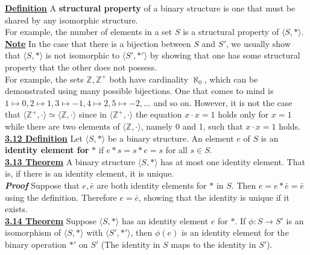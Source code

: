 \documentclass[12pt, letterpaper]{article}
\begin{document}
\noindent\underline{{\bf Definition}} A {\bf structural property} of a binary structure is one that must be shared by any isomorphic structure. \\

For example, the number of elements in a set $S$ is a structural property of $\langle S, *\rangle$. \\

\noindent \underline{{\bf Note}} In the case that there is a bijection between $S$ and $S'$, we usually show that $\langle S, *\rangle$ is not isomorphic to $\langle S', *'\rangle$ by showing that one has some structural property that the other does not possess. \\

For example, the sets $\mathbb{Z},\mathbb{Z}^+$ both have cardinality $\aleph_0$, which can be demonstrated using many possible bijections. One that comes to mind is $1 \mapsto 0, 2 \mapsto 1, 3 \mapsto -1, 4 \mapsto 2, 5 \mapsto -2, ...$ and so on. However, it is not the case that $\langle \mathbb{Z}^+, \cdot \rangle \simeq \langle \mathbb{Z}, \cdot \rangle$ since in $\langle \mathbb{Z}^+, \cdot \rangle$ the equation $x \cdot x = 1$ holds only for $x = 1$ while there are two elements of $\langle \mathbb{Z}, \cdot \rangle$, namely 0 and 1, such that $x \cdot x = 1$ holds. \\

\noindent\underline{{\bf 3.12 Definition}} Let $\langle S, * \rangle$ be a binary structure. An element $e$ of $S$ is an {\bf identity element for} $*$ if $e*s = s*e = s$ for all $s \in S$. \\

\noindent \underline{{\bf 3.13 Theorem}} A binary structure $\langle S, * \rangle$ has at most one identity element. That is, if there is an identity element, it is unique. \\

\noindent \textit{\bf Proof} Suppose that $e,\bar{e}$ are both identity elements for $*$ in $S$. Then $e = e*\bar{e} = \bar{e}$ using the definition. Therefore $e = \bar{e}$, showing that the identity is unique if it exists. \\

\noindent \underline{\bf 3.14 Theorem} Suppose $\langle S, * \rangle$ has an identity element $e$ for $*$. If $\phi : S \rightarrow S'$ is an isomorphism of $\langle S, * \rangle$ with $\langle S', *' \rangle$, then $\phi(e)$ is an identity element for the binary operation $*'$ on $S'$ (The identity in $S$ maps to the identity in $S'$). 
\end{document}
